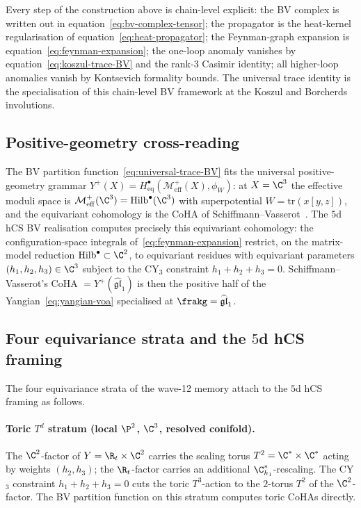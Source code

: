 Every step of the construction above is chain-level explicit: the BV
complex is written out in equation~\eqref{eq:bv-complex-tensor}; the
propagator is the heat-kernel regularisation of
equation~\eqref{eq:heat-propagator}; the Feynman-graph expansion is
equation~\eqref{eq:feynman-expansion}; the one-loop anomaly vanishes
by equation~\eqref{eq:koszul-trace-BV} and the rank-$3$ Casimir
identity; all higher-loop anomalies vanish by Kontsevich formality
bounds. The universal trace identity is the specialisation of this
chain-level BV framework at the Koszul and Borcherds involutions.

\subsection*{Positive-geometry cross-reading}

The BV partition function~\eqref{eq:universal-trace-BV} fits the
universal positive-geometry grammar
$Y^+(X) = H^\bullet_{\mathrm{eq}}(\mathcal{M}^+_{\mathrm{eff}}(X), \phi_W)$:
at $X = \C^3$ the effective moduli space is
$\mathcal{M}^+_{\mathrm{eff}}(\C^3) = \mathrm{Hilb}^\bullet(\C^3)$ with
superpotential $W = \mathrm{tr}(x[y,z])$, and the equivariant cohomology
is the CoHA of Schiffmann--Vasserot~\cite{SchiffmannVasserot2013}.
The $5$d hCS BV realisation computes precisely this equivariant
cohomology: the configuration-space integrals
of~\eqref{eq:feynman-expansion} restrict, on the matrix-model
reduction $\mathrm{Hilb}^\bullet\subset \C^2$, to equivariant
residues with equivariant parameters $(h_1, h_2, h_3)\in\C^3$ subject
to the CY$_3$ constraint $h_1 + h_2 + h_3 = 0$. Schiffmann--Vasserot's
CoHA $= Y^+(\widehat{\mathfrak{gl}}_1)$ is then the positive half of
the Yangian~\eqref{eq:yangian-voa} specialised at $\frakg =
\widehat{\mathfrak{gl}}_1$.

\subsection*{Four equivariance strata and the $5$d hCS framing}

The four equivariance strata of the wave-12 memory attach to the
$5$d hCS framing as follows.

\paragraph{Toric $T^d$ stratum (local $\P^2$, $\C^3$, resolved conifold).}
The $\C^2$-factor of $Y = \R_t\times\C^2$ carries the scaling torus
$T^2 = \C^*\times\C^*$ acting by weights $(h_2, h_3)$; the $\R_t$-factor
carries an additional $\C^*_{h_1}$-rescaling. The CY$_3$ constraint
$h_1 + h_2 + h_3 = 0$ cuts the toric $T^3$-action to the
$2$-torus $T^2$ of the $\C^2$-factor. The BV partition function on
this stratum computes toric CoHAs directly.

